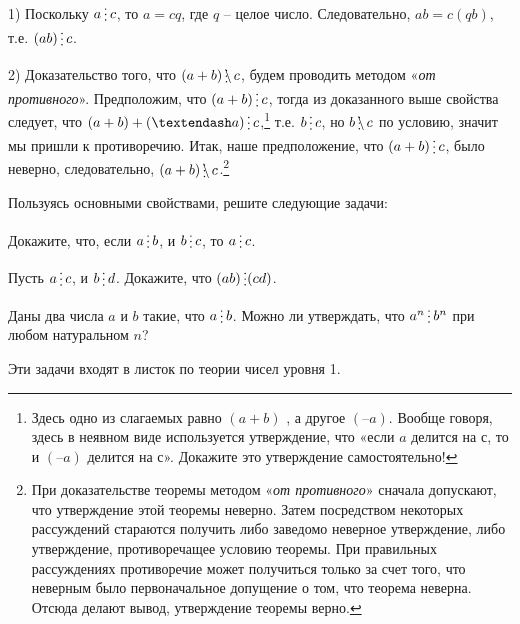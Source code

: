 
\begin{dok}
1) Поскольку $a\del c$, то $a = cq$, где $q$ – целое число. Следовательно, $ab = c(qb)$, т.е. $(ab)\del c$.

2) Доказательство того, что $(a + b)\ndel c$, будем проводить методом «\textit{от противного}». Предположим, что $(a + b)\del c$, тогда из доказанного выше свойства следует, что $(a + b) + (–a)\del c$,\footnote{Здесь одно из слагаемых равно $(a + b)$ , а другое $(–a)$. Вообще говоря, здесь в неявном виде используется утверждение, что «если $a$ делится на $с$, то и $(–a)$ делится на $с$». Докажите это утверждение самостоятельно!} т.е. $b\del c$, но $b \ndel c$ по условию, значит мы пришли к противоречию. Итак, наше предположение, что $(a + b)\del c$, было неверно,  следовательно, $(a + b) \ndel c$.\footnote{При доказательстве теоремы методом «\textit{от противного}» сначала допускают, что утверждение этой теоремы неверно. Затем посредством некоторых рассуждений стараются получить либо заведомо неверное утверждение, либо утверждение, противоречащее условию теоремы. При правильных рассуждениях противоречие может получиться только за счет того, что неверным было первоначальное допущение о том, что теорема неверна. Отсюда делают вывод, утверждение теоремы верно.}
\end{dok}

Пользуясь основными свойствами, решите следующие задачи:

\begin{thm}
	Докажите, что, если $a\del b$, и $b\del c$, то $a\del c$.
\end{thm}

\begin{thm}
	Пусть $a \del c$, и $b \del d$. Докажите, что $(ab) \del (cd)$.
\end{thm}

\begin{thm}
	Даны два числа $a$ и $b$ такие, что $a\del b$. Можно ли утверждать, что $a^n\del b^n$ при любом натуральном $n$?
\end{thm}

\begin{prim}
    Эти задачи входят в листок по теории чисел уровня 1.
\end{prim}

